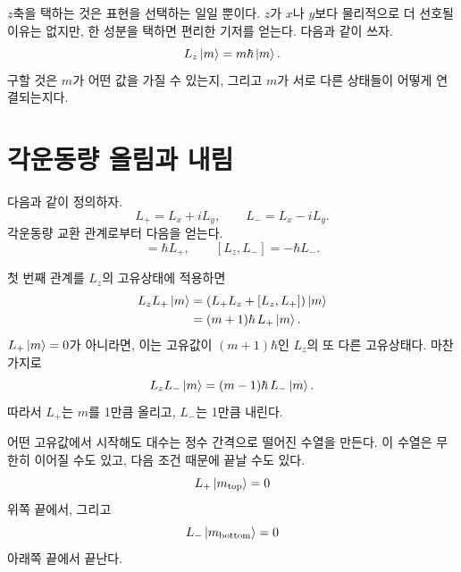\(z\)축을 택하는 것은 표현을 선택하는 일일 뿐이다. \(z\)가 \(x\)나 \(y\)보다 물리적으로 더 선호될 이유는 없지만, 한 성분을 택하면 편리한 기저를 얻는다. 다음과 같이 쓰자.
\begin{equation}
L_z\left\lvert m\right\rangle=m\hbar\left\lvert m\right\rangle.
\end{equation}
구할 것은 \(m\)가 어떤 값을 가질 수 있는지, 그리고 \(m\)가 서로 다른 상태들이 어떻게 연결되는지다.

\begin{classroomqa}
\end{classroomqa}

\section{각운동량 올림과 내림}

다음과 같이 정의하자.
\begin{equation}
L_+=L_x+iL_y,
\qquad
L_-=L_x-iL_y.
\end{equation}
각운동량 교환 관계로부터 다음을 얻는다.
\begin{equation}
[L_z,L_+]=\hbar L_+,
\qquad
[L_z,L_-]=-\hbar L_-.
\end{equation}

첫 번째 관계를 \(L_z\)의 고유상태에 적용하면
\begin{align}
L_zL_+\left\lvert m\right\rangle
&=\left(L_+L_z+[L_z,L_+]\right)\left\lvert m\right\rangle\\
&=(m+1)\hbar\,L_+\left\lvert m\right\rangle.
\end{align}
\(L_+\left\lvert m\right\rangle=0\)가 아니라면, 이는 고유값이 \((m+1)\hbar\)인 \(L_z\)의 또 다른 고유상태다. 마찬가지로
\begin{equation}
L_zL_-\left\lvert m\right\rangle
=(m-1)\hbar\,L_-\left\lvert m\right\rangle.
\end{equation}
따라서 \(L_+\)는 \(m\)를 1만큼 올리고, \(L_-\)는 1만큼 내린다.

어떤 고유값에서 시작해도 대수는 정수 간격으로 떨어진 수열을 만든다. 이 수열은 무한히 이어질 수도 있고, 다음 조건 때문에 끝날 수도 있다.
\begin{equation}
L_+\left\lvert m_{\mathrm{top}}\right\rangle=0
\end{equation}
위쪽 끝에서, 그리고
\begin{equation}
L_-\left\lvert m_{\mathrm{bottom}}\right\rangle=0
\end{equation}
아래쪽 끝에서 끝난다.

